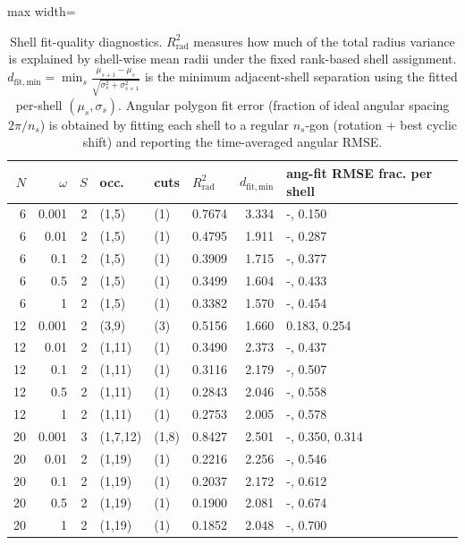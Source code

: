 \begin{table}[t]
\centering
\small
\setlength{\tabcolsep}{3.5pt}
\renewcommand{\arraystretch}{1.12}
\begin{adjustbox}{max width=\textwidth}
\begin{tabular}{rrrlllrl}
\toprule
$N$ & $\omega$ & $S$ & occ. & cuts & $R^2_{\mathrm{rad}}$ & $d_{\mathrm{fit,min}}$ & ang-fit RMSE frac. per shell \\
\midrule
6 & 0.001 & 2 & (1,5) & (1) & 0.7674 & 3.334 & -, 0.150 \\
6 & 0.01 & 2 & (1,5) & (1) & 0.4795 & 1.911 & -, 0.287 \\
6 & 0.1 & 2 & (1,5) & (1) & 0.3909 & 1.715 & -, 0.377 \\
6 & 0.5 & 2 & (1,5) & (1) & 0.3499 & 1.604 & -, 0.433 \\
6 & 1 & 2 & (1,5) & (1) & 0.3382 & 1.570 & -, 0.454 \\
12 & 0.001 & 2 & (3,9) & (3) & 0.5156 & 1.660 & 0.183, 0.254 \\
12 & 0.01 & 2 & (1,11) & (1) & 0.3490 & 2.373 & -, 0.437 \\
12 & 0.1 & 2 & (1,11) & (1) & 0.3116 & 2.179 & -, 0.507 \\
12 & 0.5 & 2 & (1,11) & (1) & 0.2843 & 2.046 & -, 0.558 \\
12 & 1 & 2 & (1,11) & (1) & 0.2753 & 2.005 & -, 0.578 \\
20 & 0.001 & 3 & (1,7,12) & (1,8) & 0.8427 & 2.501 & -, 0.350, 0.314 \\
20 & 0.01 & 2 & (1,19) & (1) & 0.2216 & 2.256 & -, 0.546 \\
20 & 0.1 & 2 & (1,19) & (1) & 0.2037 & 2.172 & -, 0.612 \\
20 & 0.5 & 2 & (1,19) & (1) & 0.1900 & 2.081 & -, 0.674 \\
20 & 1 & 2 & (1,19) & (1) & 0.1852 & 2.048 & -, 0.700 \\
\bottomrule
\end{tabular}
\end{adjustbox}
\caption{Shell fit-quality diagnostics. $R^2_{\mathrm{rad}}$ measures how much of the total radius variance is explained by shell-wise mean radii under the fixed rank-based shell assignment. $d_{\mathrm{fit,min}}=\min_s\frac{\mu_{s+1}-\mu_s}{\sqrt{\sigma_s^2+\sigma_{s+1}^2}}$ is the minimum adjacent-shell separation using the fitted per-shell $(\mu_s,\sigma_s)$. Angular polygon fit error (fraction of ideal angular spacing $2\pi/n_s$) is obtained by fitting each shell to a regular $n_s$-gon (rotation + best cyclic shift) and reporting the time-averaged angular RMSE.}
\label{tab:shell_fit_quality}
\end{table}
